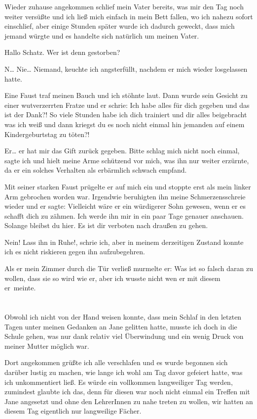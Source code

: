 \documentclass[11pt, a5paper]{article}
\newcommand{\te}{Jane } %
\begin{document}
\begin{spacing}{1.2}
		Wieder zuhause angekommen schlief mein Vater bereits, was mir den Tag noch weiter versüßte und ich ließ mich einfach in mein Bett fallen, wo ich nahezu sofort einschlief, aber einige Stunden später wurde ich dadurch geweckt, dass mich jemand würgte und es handelte sich natürlich um meinen Vater.
		
		\frqq Hallo Schatz. Wer ist denn gestorben?\flqq
		
		\frqq N… Nie… Niemand\flqq , keuchte ich angsterfüllt, nachdem er mich wieder losgelassen hatte.
		
		Eine Faust traf meinen Bauch und ich stöhnte laut. Dann wurde sein Gesicht zu einer wutverzerrten Fratze und er schrie: \frqq Ich habe alles für dich gegeben und das ist der Dank?! So viele Stunden habe ich dich trainiert und dir alles beigebracht was ich weiß und dann kriegst du es noch nicht einmal hin jemanden auf einem Kindergeburtstag zu töten?!\flqq
		
		\frqq Er… er hat mir das Gift zurück gegeben. Bitte schlag mich nicht noch einmal\flqq , sagte ich und hielt meine Arme schützend vor mich, was ihn nur weiter erzürnte, da er ein solches Verhalten als erbärmlich schwach empfand.
		
		Mit seiner starken Faust prügelte er auf mich ein und stoppte erst als mein linker Arm gebrochen worden war. Irgendwie beruhigten ihn meine Schmerzensschreie wieder und er sagte: \frqq Vielleicht wäre er ein würdigerer Sohn gewesen, wenn er es schafft dich zu zähmen. Ich werde ihn mir in ein paar Tage genauer anschauen. Solange bleibst du hier. Es ist dir verboten nach draußen zu gehen.\flqq
		
		\frqq Nein! Lass ihn in Ruhe!\flqq , schrie ich, aber in meinem derzeitigen Zustand konnte ich es nicht riskieren gegen ihn aufzubegehren.
		
		Als er mein Zimmer durch die Tür verließ murmelte er: \frqq Was ist so falsch daran zu wollen, dass sie so wird wie er\flqq , aber ich wusste nicht wen er mit diesem \frqq er\flqq\ meinte.\newpage
		
		\section{}
		Obwohl ich nicht von der Hand weisen konnte, dass mein Schlaf in den letzten Tagen unter meinen Gedanken an \te gelitten hatte, musste ich doch in die Schule gehen, was nur dank relativ viel Überwindung und ein wenig Druck von meiner Mutter möglich war.
		
		Dort angekommen grüßte ich alle verschlafen und es wurde begonnen sich darüber lustig zu machen, wie lange ich wohl am Tag davor gefeiert hatte, was ich unkommentiert ließ. Es würde ein vollkommen langweiliger Tag werden, zumindest glaubte ich das, denn für diesen war noch nicht einmal ein Treffen mit \te angesetzt und ohne den LehrerInnen zu nahe treten zu wollen, wir hatten an diesem Tag eigentlich nur langweilige Fächer.
		

\end{spacing}
\end{document}

